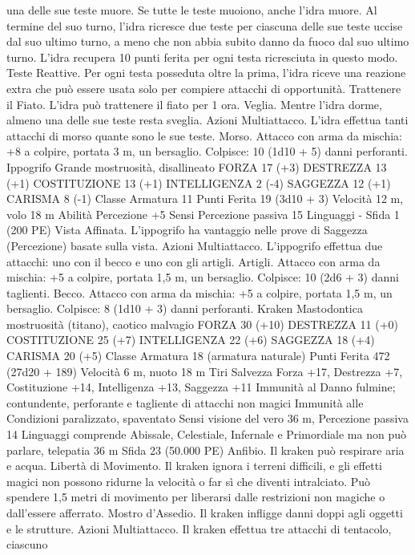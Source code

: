 \begin{multicols}{2}
una delle sue teste muore. Se tutte le teste muoiono, anche l’idra
muore.
Al termine del suo turno, l’idra ricresce due teste per ciascuna
delle sue teste uccise dal suo ultimo turno, a meno che non abbia
subito danno da fuoco dal suo ultimo turno. L’idra recupera 10
punti ferita per ogni testa ricresciuta in questo modo.
Teste Reattive. Per ogni testa posseduta oltre la prima, l’idra
riceve una reazione extra che può essere usata solo per compiere
attacchi di opportunità.
Trattenere il Fiato. L’idra può trattenere il fiato per 1 ora.
Veglia. Mentre l’idra dorme, almeno una delle sue teste resta
sveglia.
Azioni
Multiattacco. L’idra effettua tanti attacchi di morso quante sono
le sue teste.
Morso. Attacco con arma da mischia: +8 a colpire, portata 3 m,
un bersaglio.
Colpisce: 10 (1d10 + 5) danni perforanti.
Ippogrifo
Grande mostruosità, disallineato
FORZA 17 (+3)
DESTREZZA 13 (+1)
COSTITUZIONE 13 (+1)
INTELLIGENZA 2 (-4)
SAGGEZZA 12 (+1)
CARISMA 8 (-1)
Classe Armatura 11
Punti Ferita 19 (3d10 + 3)
Velocità 12 m, volo 18 m
Abilità Percezione +5
Sensi Percezione passiva 15
Linguaggi -
Sfida 1 (200 PE)
Vista Affinata. L’ippogrifo ha vantaggio nelle prove di Saggezza
(Percezione) basate sulla vista.
Azioni
Multiattacco. L’ippogrifo effettua due attacchi: uno con il becco
e uno con gli artigli.
Artigli. Attacco con arma da mischia: +5 a colpire, portata 1,5
m, un bersaglio.
Colpisce: 10 (2d6 + 3) danni taglienti.
Becco. Attacco con arma da mischia: +5 a colpire, portata 1,5 m,
un bersaglio.
Colpisce: 8 (1d10 + 3) danni perforanti.
Kraken
Mastodontica mostruosità (titano), caotico malvagio
FORZA 30 (+10)
DESTREZZA 11 (+0)
COSTITUZIONE 25 (+7)
INTELLIGENZA 22 (+6)
SAGGEZZA 18 (+4)
CARISMA 20 (+5)
Classe Armatura 18 (armatura naturale)
Punti Ferita 472 (27d20 + 189)
Velocità 6 m, nuoto 18 m
Tiri Salvezza Forza +17, Destrezza +7, Costituzione +14,
Intelligenza +13, Saggezza +11
Immunità al Danno fulmine; contundente, perforante e tagliente
di attacchi non magici
Immunità alle Condizioni paralizzato, spaventato
Sensi visione del vero 36 m, Percezione passiva 14
Linguaggi comprende Abissale, Celestiale, Infernale e
Primordiale ma non può parlare, telepatia 36 m
Sfida 23 (50.000 PE)
Anfibio. Il kraken può respirare aria e acqua.
Libertà di Movimento. Il kraken ignora i terreni difficili, e gli
effetti magici non possono ridurne la velocità o far sì che diventi
intralciato. Può spendere 1,5 metri di movimento per liberarsi
dalle restrizioni non magiche o dall’essere afferrato.
Mostro d’Assedio. Il kraken infligge danni doppi agli oggetti e le
strutture.
Azioni
Multiattacco. Il kraken effettua tre attacchi di tentacolo, ciascuno

\end{multicols}
